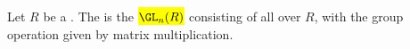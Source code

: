 \begin{definition} \label{definition:general_linear_group_over_a_ring}
    Let $R$ be a .
    The  is the  \hl{$\GL_n(R)$} consisting of all  over $R$, with the group operation given by matrix multiplication.
\end{definition}